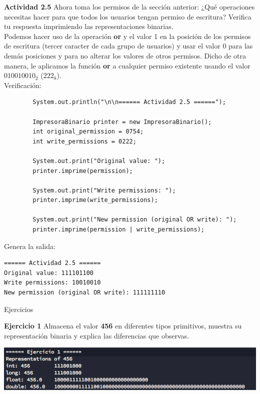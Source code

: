 \documentclass[11pt,letterpaper]{article}
\begin{document}
\textbf{Actividad 2.5} Ahora toma los permisos de la sección anterior: ¿Qué
operaciones necesitas hacer para que todos los usuarios tengan permiso de
escritura? Verifica tu respuesta imprimiendo las representaciones binarias. \\

    Podemos hacer uso de la operación \textbf{or} y el valor 1 en la posición
    de los permisos de escritura (tercer caracter de cada grupo de usuarios)
    y usar el valor 0 para las demás posiciones y para no alterar los valores
    de otros permisos. Dicho de otra manera, le aplicamos la función \textbf{or}
    a cualquier permiso existente usando el valor \textbf{$010010010_2$} ($222_8$). \\

    \clearpage
    Verificación:

    \begin{verbatim}
        System.out.println("\n\n====== Actividad 2.5 ======");

        ImpresoraBinario printer = new ImpresoraBinario();
        int original_permission = 0754;
        int write_permissions = 0222;

        System.out.print("Original value: ");
        printer.imprime(permission);

        System.out.print("Write permissions: ");
        printer.imprime(write_permissions);

        System.out.print("New permission (original OR write): ");
        printer.imprime(permission | write_permissions);
    \end{verbatim}

    Genera la salida:
    \begin{verbatim}
====== Actividad 2.5 ======
Original value: 111101100
Write permissions: 10010010
New permission (original OR write): 111111110
    \end{verbatim}

{\LARGE Ejercicios \par}

\textbf{Ejercicio 1} Almacena el valor \textbf{456} en diferentes tipos primitivos,
muestra su representación binaria y explica las diferencias que observas. \\

    \begin{center}
        \includegraphics[scale=.7]{assets/img/e-1.png}
    \end{center}
\end{document}
